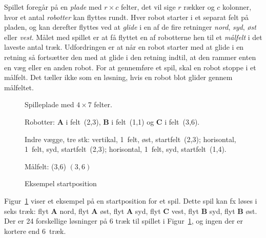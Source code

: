 Spillet foregår på en \emph{plade} med $r \times c$ felter, det vil
sige $r$ rækker og $c$ kolonner, hvor et antal
\emph{robotter} kan flyttes rundt. Hver robot starter i et separat felt på
pladen, og kan derefter flyttes ved at \emph{glide} i en af de fire
retninger \emph{nord}, \emph{syd}, \emph{øst} eller \emph{vest}. Målet
med spillet er at få flyttet en af robotterne hen til et
\emph{målfelt} i det laveste antal træk. Udfordringen er at når en
robot starter med at glide i en retning så fortsætter den med at glide
i den retning indtil, at den rammer enten en væg eller en anden
robot. For at gennemføre et spil, skal en robot stoppe i et
målfelt. Det tæller ikke som en løsning, hvis en robot blot glider
gennem målfeltet.

\begin{figure}
\hfill
\begin{minipage}[t]{0.4\linewidth}
  \raggedright\setlength{\parskip}{1ex}
  Spilleplade med $4\times 7$ felter.

  Robotter: \textbf{A} i felt~(2,3), \textbf{B} i felt~(1,1) og
  \textbf{C} i felt~(3,6).

  Indre vægge, tre stk: vertikal, 1~felt, øst,
startfelt~(2,3); horisontal, 1~felt, syd, startfelt~(2,3); horisontal,
1~felt, syd, startfelt~(1,4).

  Målfelt: (3,6) $(3,6)$
\end{minipage}
  \caption{Eksempel startposition}
  \label{fig:example}
\end{figure}

Figur~\ref{fig:example} viser et eksempel på en startposition for et
spil. Dette spil kan fx løses i seks træk: flyt \textbf{A} nord, flyt
\textbf{A} øst, flyt \textbf{A} syd, flyt \textbf{C} vest, flyt
\textbf{B} syd, flyt \textbf{B} øst. Der er 24 forskellige løsninger
på 6 træk til spillet i Figur~\ref{fig:example}, og ingen der er
kortere end 6~træk.

